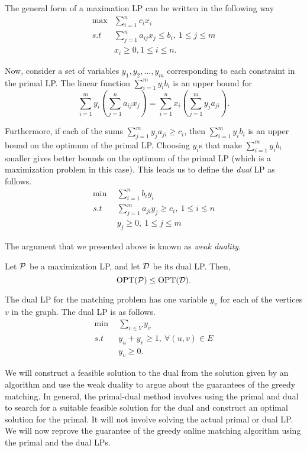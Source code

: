 The general form of a maximation LP can be written in the following way
\begin{align*}
   \max & \sum_{i=1}^n c_i x_i \\
   s.t & \sum_{j=1}^n a_{ij}x_j \leq b_i, ~ 1\leq j \leq m\\
  & x_i \geq 0, 1\leq i\leq n.
\end{align*}

Now, consider a set of variables $y_1, y_2, \ldots, y_m$ corresponding to each
constraint in the primal LP. The linear function $\sum_{i=1}^m y_i b_i$ is an
upper bound for
$$\sum_{i=1}^m y_i \left(\sum_{j=1}^n a_{ij}x_j \right) =
\sum_{i=1}^n x_i\left( \sum_{j=1}^m y_j a_{ji}\right).$$

Furthermore, if each of the sums $\sum_{j=1}^m y_j a_{ji} \geq c_i$, then
$\sum_{i=1}^m y_ib_i$ is an upper bound on the optimum of the primal
LP. Choosing $y_i$s that make $\sum_{i=1}^m y_ib_i$ smaller gives better bounds
on the optimum of the primal LP (which is a maximization problem in this
case). This leads us to define the \emph{dual} LP as follows.
\begin{align*}
  \min ~&~ \sum_{i=1}^n b_i y_i \\
  s.t ~&~ \sum_{j=1}^m a_{ji}y_j \geq c_i, ~ 1\leq i \leq n\\
  &~ y_j \geq 0, ~ 1\leq j\leq m
\end{align*}

The argument that we presented above is known as \emph{weak duality}.
\begin{lemma}
  Let ${\cal P}$ be a maximization LP, and let ${\cal D}$ be its dual LP. Then,
  $$\operatorname{OPT}({\cal P}) \leq \operatorname{OPT}({\cal D}).$$
  \label{lem:weak-dual}
\end{lemma}

The dual LP for the matching problem has one variable $y_v$ for each of the
vertices $v$ in the graph. The dual LP is as follows.
\begin{align*}
  \min ~&~ \sum_{v\in V} y_v \\
  s.t ~&~ y_u + y_v \geq 1, ~\forall (u,v)\in E\\
  &~ y_v \geq 0.
\end{align*}

We will construct a feasible solution to the dual from the solution given by an
algorithm and use the weak duality to argue about the guarantees of the greedy
matching. In general, the primal-dual method involves using the primal and dual
to search for a suitable feasible solution for the dual and construct an optimal
solution for the primal. It will not involve solving the actual
primal or dual LP. We will now reprove the guarantee of the greedy online
matching algorithm using the primal and the dual LPs.

